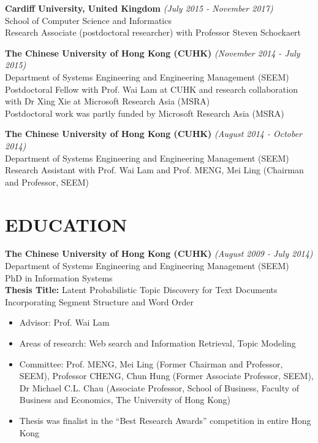 \documentclass[margin]{res}
\begin{document}
\begin{resume}
{\bf Cardiff University, United Kingdom} \hfill \textit{(July 2015 - November 2017)}\\
School of Computer Science and Informatics\\
Research Associate (postdoctoral researcher) with Professor Steven Schockaert

{\bf The Chinese University of Hong Kong (CUHK)} \hfill \textit{(November 2014 - July 2015)}\\
Department of Systems Engineering and Engineering Management (SEEM)\\
Postdoctoral Fellow with Prof. Wai Lam at CUHK and research collaboration with Dr Xing Xie at Microsoft Research Asia (MSRA)\\
Postdoctoral work was partly funded by Microsoft Research Asia (MSRA)

{\bf The Chinese University of Hong Kong (CUHK)} \hfill \textit{(August 2014 - October 2014)}\\
Department of Systems Engineering and Engineering Management (SEEM)\\
Research Assistant with Prof. Wai Lam and Prof. MENG, Mei Ling (Chairman and Professor, SEEM)

\section{EDUCATION}
 {\bf The Chinese University of Hong Kong (CUHK)} \hfill \textit{(August 2009 - July 2014)}\\
 Department of Systems Engineering and Engineering Management (SEEM)\\
PhD in Information Systems\\
\textbf{Thesis Title:} Latent Probabilistic Topic Discovery for Text Documents Incorporating Segment Structure and Word Order
\begin{itemize} \itemsep -13pt
\item {Advisor: Prof. Wai Lam}\\
\item {Areas of research: Web search and Information Retrieval, Topic Modeling}\\
\item {Committee: Prof. MENG, Mei Ling (Former Chairman and Professor, SEEM),  Professor CHENG, Chun Hung (Former Associate Professor, SEEM), Dr Michael C.L. Chau (Associate Professor, School of Business, Faculty of Business and Economics, The University of Hong Kong)}\\
\item Thesis was finalist in the ``Best Research Awards'' competition in entire Hong Kong
\end{itemize}


\end{resume}
\end{document}
